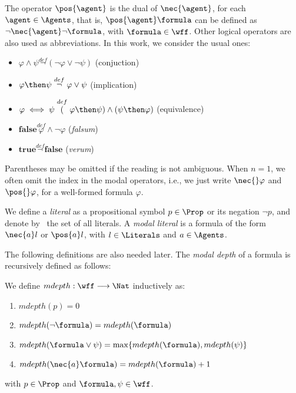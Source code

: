 The operator $\pos{\agent}$ is the dual of $\nec{\agent}$, for each $\agent \in
\Agents$, that is, $\pos{\agent} \formula$ can be defined as $\neg \nec{\agent} \neg
\formula$, with $\formula \in \wff$. Other logical operators are also used as abbreviations.
In this work, we consider the usual ones:
\begin{itemize}
    \item $\varphi \wedge \psi \stackrel{def} \neg(\neg \varphi \lor \neg \psi)$ (conjuction)
    \item $\varphi \then \psi \stackrel{def} \neg \varphi \lor \psi$ (implication)
    \item $\varphi \iff \psi \stackrel{def} (\varphi \then \psi) \land (\psi \then \varphi)$ (equivalence)
    \item $\textbf{false} \stackrel{def} \varphi \wedge \neg \varphi$ (\emph{falsum})
    \item $ \textbf{true} \stackrel{def} \neg \textbf{false}$ (\emph{verum}) 
\end{itemize}

Parentheses may be omitted if the reading is not ambiguous.  When $n = 1$, we
often omit the index in the modal operators, i.e., we just write $\nec{}
\varphi$ and $\pos{}\varphi$, for a well-formed formula $\varphi$. 

We define a \emph{literal} as a propositional symbol $p \in \Prop$ or its negation $\neg
p$, and denote by \Literals~the set of all literals. A \emph{modal literal} is a
formula of the form $\nec{a} l$ or $\pos{a} l$, with $l \in \Literals$ and $a
\in \Agents$.

The following definitions are also needed later. The
\emph{modal depth} of a formula is recursively defined as follows:

\begin{definition}
    We define $mdepth : \wff \longrightarrow \Nat$ inductively as:
    \begin{enumerate}
        \item $mdepth(p) = 0$ 
        \item $mdepth(\neg \formula) = mdepth(\formula)$
        \item $mdepth(\formula \lor \psi) = \max\{mdepth(\formula), mdepth(\psi)\}$
        \item $mdepth(\nec{a} \formula) = mdepth(\formula) + 1$
    \end{enumerate}
    with $p \in \Prop$ and $\formula, \psi \in \wff$.
\end{definition}

